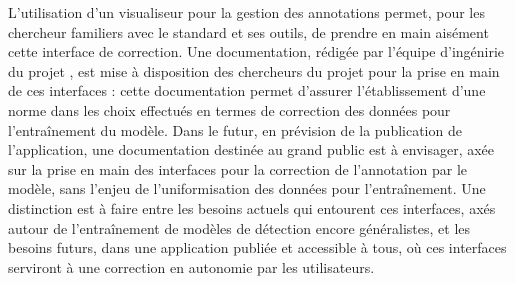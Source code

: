L'utilisation d'un visualiseur \iiif pour la gestion des annotations permet, pour les chercheur familiers avec le standard et ses outils, de prendre en main aisément cette interface de correction. Une documentation, rédigée par l'équipe d'ingénirie du projet \eida, est mise à disposition des chercheurs du projet pour la prise en main de ces interfaces : cette documentation permet d'assurer l'établissement d'une norme dans les choix effectués en termes de correction des données pour l'entraînement du modèle. Dans le futur, en prévision de la publication de l'application, une documentation destinée au grand public est à envisager, axée sur la prise en main des interfaces pour la correction de l'annotation par le modèle, sans l'enjeu de l'uniformisation des données pour l'entraînement. Une distinction est à faire entre les besoins actuels qui entourent ces interfaces, axés autour de l'entraînement de modèles de détection encore généralistes, et les besoins futurs, dans une application publiée et accessible à tous, où ces interfaces serviront à une correction en autonomie par les utilisateurs.

